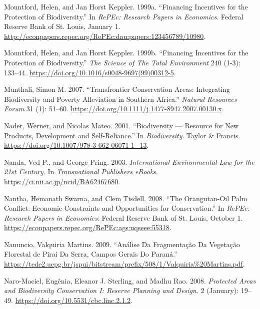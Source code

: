 \begin{CSLReferences}{1}{1}
Mountford, Helen, and Jan Horst Keppler. 1999a. {``Financing Incentives
for the Protection of Biodiversity.''} In \emph{RePEc: Research Papers
in Economics}. Federal Reserve Bank of St. Louis, January 1.
\url{http://econpapers.repec.org/RePEc:dau:papers:123456789/10980}.

Mountford, Helen, and Jan Horst Keppler. 1999b. {``Financing Incentives
for the Protection of Biodiversity.''} \emph{The Science of The Total
Environment} 240 (1-3): 133--44.
\url{https://doi.org/10.1016/s0048-9697(99)00312-5}.

Munthali, Simon M. 2007. {``Transfrontier Conservation Areas:
Integrating Biodiversity and Poverty Alleviation in Southern Africa.''}
\emph{Natural Resources Forum} 31 (1): 51--60.
\url{https://doi.org/10.1111/j.1477-8947.2007.00130.x}.

Nader, Werner, and Nicolas Mateo. 2001. {``Biodiversity --- Resource for
New Products, Development and Self-Reliance.''} In \emph{Biodiversity}.
Taylor \& Francis. \url{https://doi.org/10.1007/978-3-662-06071-1_13}.

Nanda, Ved P., and George Pring. 2003. \emph{International Environmental
Law for the 21st Century}. In \emph{Transnational Publishers eBooks}.
\url{https://ci.nii.ac.jp/ncid/BA62467680}.

Nantha, Hemanath Swarna, and Clem Tisdell. 2008. {``The Orangutan-Oil
Palm Conflict: Economic Constraints and Opportunities for
Conservation.''} In \emph{RePEc: Research Papers in Economics}. Federal
Reserve Bank of St. Louis, October 1.
\url{https://econpapers.repec.org/RePEc:ags:uqseee:55318}.

Nanuncio, Valquiria Martins. 2009. {``Análise Da Fragmentação Da
Vegetação Florestal de Piraí Da Serra, Campos Gerais Do Paraná.''}
\url{https://tede2.uepg.br/jspui/bitstream/prefix/508/1/Valquiria\%20Martins.pdf}.

Naro‐Maciel, Eugênia, Eleanor J. Sterling, and Madhu Rao. 2008.
\emph{Protected Areas and Biodiversity Conservation I: Reserve Planning
and Design}. 2 (January): 19--49.
\url{https://doi.org/10.5531/cbc.linc.2.1.2}.


\end{CSLReferences}
